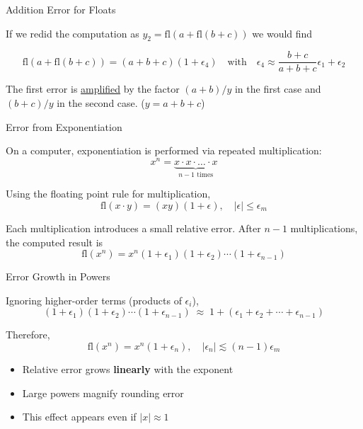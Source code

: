 \documentclass[10pt]{beamer}
\begin{document}
\begin{frame}{Addition Error for Floats}

If we redid the computation as $ y_2 = \mathrm{fl}( a + \mathrm{fl}(b+c)) $
we would find 

\[
\mathrm{fl}( a + \mathrm{fl}(b+c)) = (a+b+c) (1 + \epsilon_4) 
\quad \mbox{with} \quad \epsilon_4 \approx \frac{b+c}{a+b+c} \epsilon_1
+ \epsilon_2\]

The first error is \underline{amplified} by the factor $(a+b)/y$ in the
   first case and $(b+c)/y$ in the second case. ($y = a+b+c$) 

\bigskip
{}
\end{frame}

\begin{frame}{Error from Exponentiation}


\bigskip

On a computer, exponentiation is performed via repeated multiplication:
\[
x^n = \underbrace{x \cdot x \cdot \dots \cdot x}_{n-1 \text{ times}}
\]

Using the floating point rule for multiplication,
\[
\mathrm{fl}(x \cdot y) = (x y)(1+\epsilon), \quad |\epsilon| \le \epsilon_m
\]

\bigskip

Each multiplication introduces a small relative error.
After $n-1$ multiplications, the computed result is
\[
\mathrm{fl}(x^n) = x^n (1+\epsilon_1)(1+\epsilon_2)\cdots(1+\epsilon_{n-1})
\]

\end{frame}

\begin{frame}{Error Growth in Powers}

Ignoring higher-order terms (products of $\epsilon_i$),
\[
(1+\epsilon_1)(1+\epsilon_2)\cdots(1+\epsilon_{n-1})
\;\approx\;
1 + (\epsilon_1 + \epsilon_2 + \cdots + \epsilon_{n-1})
\]

Therefore,
\[
\mathrm{fl}(x^n) = x^n (1 + \epsilon_n),
\quad
|\epsilon_n| \lesssim (n-1)\epsilon_m
\]

\bigskip

\begin{itemize}
    \item Relative error grows \textbf{linearly} with the exponent
    \item Large powers magnify rounding error
    \item This effect appears even if $|x| \approx 1$
\end{itemize}

\bigskip


\end{frame}
\end{document}
